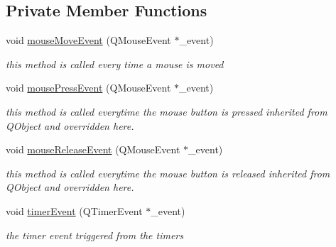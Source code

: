 \subsection*{Private Member Functions}
\begin{DoxyCompactItemize}
\item 
void \hyperlink{class_g_l_window_a7a04e2a3400fa69d1bcb6b650425c01e}{mouseMoveEvent} (QMouseEvent $\ast$\_\-event)
\begin{DoxyCompactList}\small\item\em this method is called every time a mouse is moved \item\end{DoxyCompactList}\item 
void \hyperlink{class_g_l_window_a2c4d9af80c2a7a33a46bce46276b8409}{mousePressEvent} (QMouseEvent $\ast$\_\-event)
\begin{DoxyCompactList}\small\item\em this method is called everytime the mouse button is pressed inherited from QObject and overridden here. \item\end{DoxyCompactList}\item 
void \hyperlink{class_g_l_window_ab9e5741b8c69d2f6447a5fc6d9d704c8}{mouseReleaseEvent} (QMouseEvent $\ast$\_\-event)
\begin{DoxyCompactList}\small\item\em this method is called everytime the mouse button is released inherited from QObject and overridden here. \item\end{DoxyCompactList}\item 
void \hyperlink{class_g_l_window_a8901509418ab117e8613d624df9b5666}{timerEvent} (QTimerEvent $\ast$\_\-event)
\begin{DoxyCompactList}\small\item\em the timer event triggered from the timers \item\end{DoxyCompactList}\end{DoxyCompactItemize}
